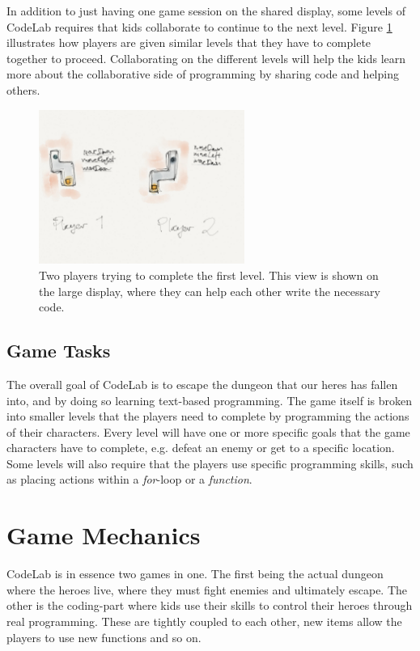 \documentclass[12pt,journal,compsoc, a4paper, onecolumn]{IEEEtran}
\begin{document}
In addition to just having one game session on the shared display, some levels
of CodeLab requires that kids collaborate to continue to the next level. Figure
\ref{fig:2p} illustrates how players are given similar levels that they have to
complete together to proceed.  Collaborating on the different levels will help
the kids learn more about the collaborative side of programming by sharing code
and helping others. 

\begin{figure}[htb]
    \begin{centering}
    \includegraphics[width=0.6\textwidth]{./figures/codelab5.jpg}
    \caption{Two players trying to complete the first level. This view is shown
    on the large display, where they can help each other write the necessary
    code. } 
    \label{fig:2p}
    \end{centering} 
\end{figure}

\subsection{Game Tasks} 
The overall goal of CodeLab is to escape the dungeon that our heres has fallen
into, and by doing so learning text-based programming. The game itself is broken
into smaller levels that the players need to complete by programming the actions
of their characters. Every level will have one or more specific goals that the
game characters have to complete, e.g. defeat an enemy or get to a specific
location. Some levels will also require that the players use specific
programming skills, such as placing actions within a \emph{for}-loop or a
\emph{function}. 


\section{Game Mechanics} 
CodeLab is in essence two games in one. The first being the actual dungeon where
the heroes live, where they must fight enemies and ultimately escape. The other
is the coding-part where kids use their skills to control their heroes through
real programming. These are tightly coupled to each other, new items allow the
players to use new functions and so on. 
\end{document}
